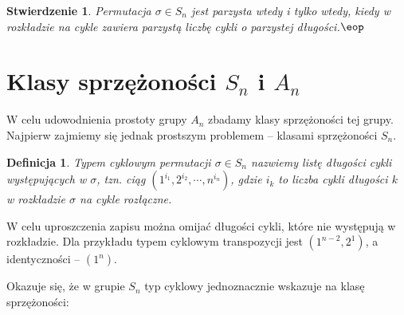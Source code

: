 \documentclass[licencjacka]{pracamgr}
\newtheorem{deff}{Definicja}[section]
\newtheorem{fact}{Stwierdzenie}[section]
\begin{document}
\begin{fact}\label{fact_typ_A_n}
    Permutacja $\sigma \in S_n$ jest parzysta wtedy i tylko wtedy, kiedy w rozkładzie na cykle
    zawiera parzystą liczbę cykli o parzystej długości.\quad$\eop$
\end{fact}


\section{Klasy sprzężoności $S_n$ i $A_n$}

W celu udowodnienia prostoty grupy $A_n$ zbadamy klasy
sprzężoności tej grupy. Najpierw zajmiemy się jednak prostszym
problemem -- klasami sprzężoności $S_n$.

\begin{deff}
    \emph{Typem cyklowym} permutacji $\sigma \in S_n$ nazwiemy listę długości cykli występujących w $\sigma$,
    tzn. ciąg $(1^{i_1}, 2^{i_2}, \cdots, n^{i_n})$,
    gdzie $i_k$ to liczba cykli długości $k$ w rozkładzie $\sigma$ na cykle rozłączne.
\end{deff}
W celu uproszczenia zapisu można omijać długości cykli, które nie
występują w rozkładzie. Dla przykładu typem cyklowym transpozycji
jest $(1^{n-2}, 2^1)$, a identyczności -- $(1^n)$.

Okazuje się, że w grupie $S_n$ typ cyklowy jednoznacznie wskazuje na
klasę sprzężoności:
\end{document}
